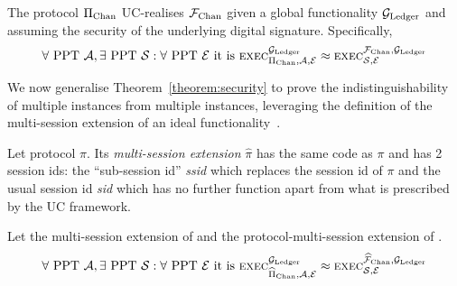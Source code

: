 \begin{theorem}
  \label{theorem:security}
  The protocol $\Pi_{\mathrm{Chan}}$ UC-realises $\mathcal{F}_{\mathrm{Chan}}$ given a global functionality
  $\mathcal{G}_{\mathrm{Ledger}}$ and assuming the security of the underlying digital signature.
  Specifically,
  \begin{gather*}
    \forall \text{ PPT } \mathcal{A}, \exists \text{ PPT } \mathcal{S}: \forall
    \text{ PPT } \mathcal{E} \text{ it is }
    \textsc{exec}^{\mathcal{G}_{\mathrm{Ledger}}}_{\Pi_{\mathrm{Chan}}, \mathcal{A}, \mathcal{E}} \approx
    \textsc{exec}^{\mathcal{F}_{\mathrm{Chan}}, \mathcal{G}_{\mathrm{Ledger}}}_{\mathcal{S}, \mathcal{E}}
  \end{gather*}
\end{theorem}


We now generalise Theorem~\ref{theorem:security} to prove the
indistinguishability of multiple \fchan instances from multiple \pchan
instances, leveraging the definition of the multi-session extension of an ideal
functionality~\cite{DBLP:conf/crypto/CanettiR03}.

\begin{definition}
  Let protocol $\pi$. Its \emph{multi-session extension} $\hat{\pi}$ has the
  same code as $\pi$ and has 2 session ids: the ``sub-session id''
  \emph{ssid} which replaces the session id of $\pi$ and the usual session id
  \emph{sid} which has no further function apart from what is prescribed by the
  UC framework.
\end{definition}

\begin{theorem}
  \label{theorem:multi-session-security}
  Let \fchanhat the multi-session extension of \fchan and \pchanhat the
  protocol-multi-session extension of \pchan.
  \begin{gather*}
    \forall \text{ PPT } \mathcal{A}, \exists \text{
    PPT } \mathcal{S}: \forall \text{ PPT } \mathcal{E} \text{ it is }
    \textsc{exec}^{\mathcal{G}_{\mathrm{Ledger}}}_{\widehat{\Pi}_{\mathrm{Chan}}, \mathcal{A}, \mathcal{E}} \approx
    \textsc{exec}^{\widehat{\mathcal{F}}_{\mathrm{Chan}}, \mathcal{G}_{\mathrm{Ledger}}}_{\mathcal{S}, \mathcal{E}}
  \end{gather*}
\end{theorem}

